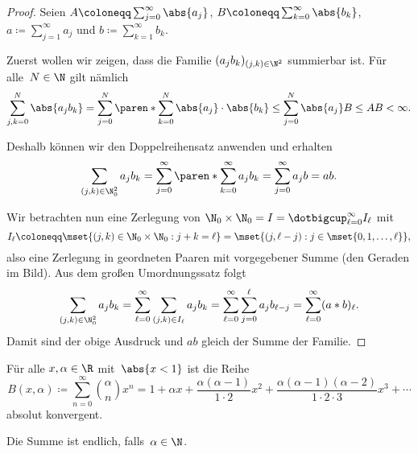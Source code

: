 \documentclass[a4paper]{article}
\begin{document}
\begin{proof}
    Seien $A \coloneqq \sum_{j=0}^\infty \abs{a_j}$, $B \coloneqq \sum_{k=0}^\infty \abs{b_k}$, $a \coloneqq \sum_{j=1}^\infty a_j$ und $b \coloneqq \sum_{k=1}^\infty b_k$.

    Zuerst wollen wir zeigen, dass die Familie $(a_jb_k)_{(j,k)\in\N^2}$ summierbar ist. Für alle~$N \in \N$ gilt nämlich
    \begin{equation*}
        \sum_{j,k=0}^N \abs{a_jb_k} = \sum_{j=0}^N \paren*{\sum_{k=0}^N \abs{a_j}\cdot\abs{b_k}} \leq \sum_{j=0}^N \abs{a_j} B \leq AB < \infty.
    \end{equation*}

    Deshalb können wir den Doppelreihensatz anwenden und erhalten
    \begin{equation*}
        \sum_{(j,k) \in \N_0^2} a_jb_k = \sum_{j=0}^\infty \paren*{\sum_{k=0}^\infty a_jb_k} = \sum_{j=0}^\infty a_jb = ab.
    \end{equation*}

    Wir betrachten nun eine Zerlegung von $\N_0\times\N_0 = I = \dotbigcup_{\ell=0}^\infty I_\ell$ mit
    \begin{equation*}
        I_\ell \coloneqq \mset{(j,k) \in \N_0\times\N_0 : j+k=\ell} = \mset{(j,\ell-j) : j \in \mset{0, 1,\dots,\ell}},
    \end{equation*}
    also eine Zerlegung in geordneten Paaren mit vorgegebener Summe (den Geraden im Bild). Aus dem großen Umordnungssatz folgt
    \begin{equation*}
        \sum_{(j,k) \in \N_0^2} a_jb_k = \sum_{\ell=0}^\infty \sum_{(j,k)\in I_\ell} a_jb_k = \sum_{\ell=0}^\infty \sum_{j=0}^\ell a_jb_{\ell-j} = \sum_{\ell=0}^\infty (a*b)_{\ell}.
    \end{equation*}
    Damit sind der obige Ausdruck und $ab$ gleich der Summe der Familie.
\end{proof}

\begin{theorem}
    Für alle $x,\alpha \in \R$ mit~$\abs{x < 1}$ ist die Reihe
    \begin{equation*}
        B(x,\alpha) \coloneqq \sum_{n=0}^\infty \binom{\alpha}{n} x^n = 1 + \alpha x + \frac{\alpha(\alpha-1)}{1\cdot2} x^2 + \frac{\alpha(\alpha-1)(\alpha-2)}{1\cdot2\cdot3} x^3 + \cdots
    \end{equation*}
    absolut konvergent.
\end{theorem}

Die Summe ist endlich, falls~$\alpha \in \N$.
\end{document}
